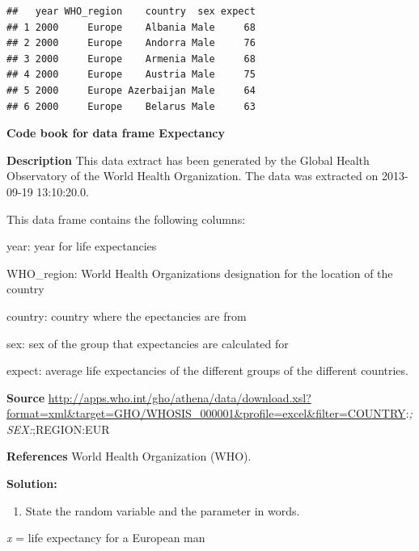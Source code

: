 \documentclass[]{book}
\newenvironment{Shaded}{\begin{snugshade}}{\end{snugshade}}
\newcommand{\KeywordTok}[1]{\textcolor[rgb]{0.13,0.29,0.53}{\textbf{#1}}}
\newcommand{\NormalTok}[1]{#1}
\newcommand{\OperatorTok}[1]{\textcolor[rgb]{0.81,0.36,0.00}{\textbf{#1}}}
\newcommand{\StringTok}[1]{\textcolor[rgb]{0.31,0.60,0.02}{#1}}
\providecommand{\tightlist}{%
  \setlength{\itemsep}{0pt}\setlength{\parskip}{0pt}}
\begin{document}
\begin{Shaded}
\end{Shaded}

\begin{verbatim}
##   year WHO_region    country  sex expect
## 1 2000     Europe    Albania Male     68
## 2 2000     Europe    Andorra Male     76
## 3 2000     Europe    Armenia Male     68
## 4 2000     Europe    Austria Male     75
## 5 2000     Europe Azerbaijan Male     64
## 6 2000     Europe    Belarus Male     63
\end{verbatim}

\textbf{Code book for data frame Expectancy}

\textbf{Description}
This data extract has been generated by the Global Health Observatory of the World Health Organization. The data was extracted on 2013-09-19 13:10:20.0.

This data frame contains the following columns:

year: year for life expectancies

WHO\_region: World Health Organizations designation for the location of the country

country: country where the epectancies are from

sex: sex of the group that expectancies are calculated for

expect: average life expectancies of the different groups of the different countries.

\textbf{Source}
\url{http://apps.who.int/gho/athena/data/download.xsl?format=xml\&target=GHO/WHOSIS_000001\&profile=excel\&filter=COUNTRY}:\emph{;SEX:};REGION:EUR

\textbf{References}
World Health Organization (WHO).

\textbf{Solution:}

\begin{enumerate}
\def\labelenumi{\arabic{enumi}.}
\tightlist
\item
  State the random variable and the parameter in words.
\end{enumerate}

\emph{x} = life expectancy for a European man
\end{document}
